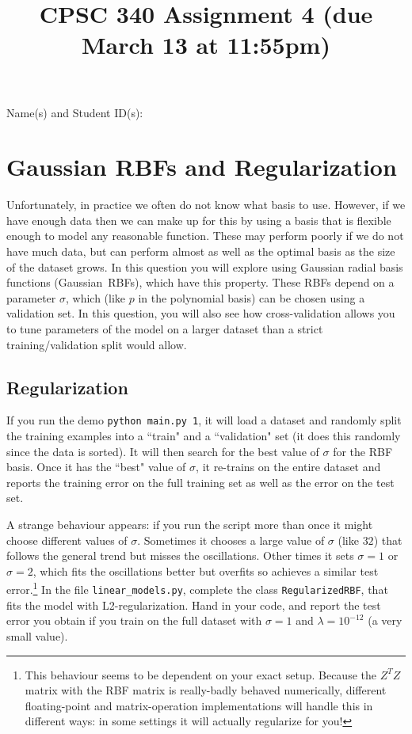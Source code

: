 \documentclass{article}
\def\blu#1{{\color{blu}#1}}
\def\red#1{{\color{red}#1}}
\begin{document}
\title{CPSC 340 Assignment 4  (\red{due March 13 at 11:55pm)}}
\author{}
\date{}
\maketitle
\vspace{-4em}


\blu{Name(s) and Student ID(s):}

\section{Gaussian RBFs and Regularization}

Unfortunately, in practice we often do not know what basis to use. However, if we have enough data then we can make up for this by using a basis that is flexible enough to model any reasonable function. These may perform poorly if we do not have much data, but can perform almost as well as the optimal basis as the size of the dataset grows. In this question you will explore using Gaussian radial basis functions (Gaussian~RBFs), which have this property. These RBFs depend on a parameter $\sigma$, which (like $p$ in the polynomial basis) can be chosen using a validation set. In this question, you will also see how cross-validation allows you to tune parameters of the model on a larger dataset than a strict training/validation split would allow.

\subsection{Regularization}

If you run the demo \verb|python main.py 1|, it will load a dataset and randomly split the training examples into a ``train" and a ``validation" set (it does this randomly since the data is sorted). It will then search for the best value of $\sigma$ for the RBF basis. Once it has the ``best" value of $\sigma$, it re-trains on the entire dataset and reports the training error on the full training set as well as the error on the test set.

A strange behaviour appears: if you run the script more than once it might choose different values of $\sigma$. Sometimes it chooses a large value of $\sigma$ (like $32$) that follows the general trend but misses the oscillations. Other times it sets $\sigma = 1$ or $\sigma=2$, which fits the oscillations better but overfits so achieves a similar test error.\footnote{This behaviour seems to be dependent on your exact setup. Because the $Z^TZ$ matrix with the RBF matrix is really-badly behaved numerically, different floating-point and matrix-operation implementations will handle this in different ways: in some settings it will actually regularize for you!} \blu{In the file  \texttt{linear\_models.py}, complete the class \texttt{RegularizedRBF}, that fits the model with L2-regularization. Hand in your code, and report the test error you obtain if you train on the full dataset with $\sigma=1$ and $\lambda = 10^{-12}$ (a very small value).}
\end{document}
